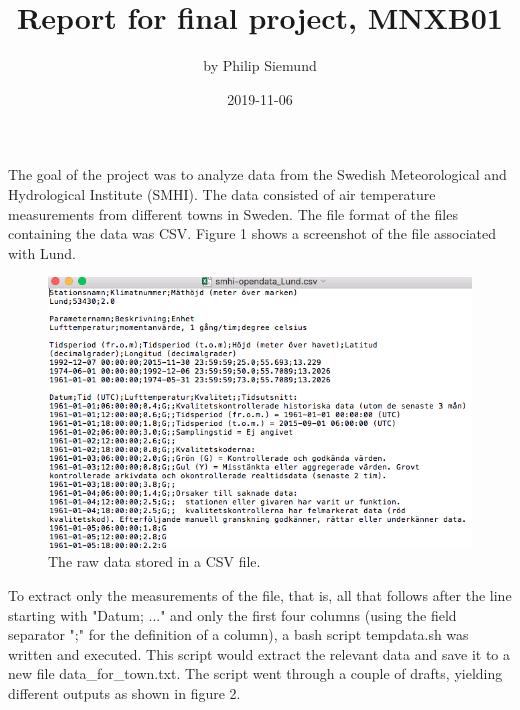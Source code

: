 \documentclass{article}
\title{Report for final project, MNXB01}
\author{by Philip Siemund}
\date{2019-11-06}
\begin{document}
\maketitle

The goal of the project was to analyze data from the Swedish Meteorological and Hydrological Institute (SMHI). The data consisted of air temperature measurements from different towns in Sweden. The file format of the files containing the data was CSV. Figure 1 shows a screenshot of the file associated with Lund. 

\begin{figure}[h]
\centering
\includegraphics[scale=0.4]{Lund0}
\caption{The raw data stored in a CSV file.}
\end{figure}

To extract only the measurements of the file, that is, all that follows after the line starting with "Datum; ..." and only the first four columns (using the field separator ";" for the definition of a column), a bash script tempdata.sh was written and executed. This script would extract the relevant data and save it to a new file data\_for\_town.txt. The script went through a couple of drafts, yielding different outputs as shown in figure 2.
\end{document}
